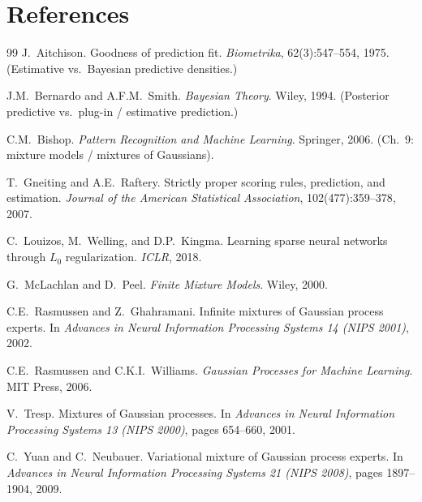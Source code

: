 \documentclass[11pt,a4paper]{article}
\theoremstyle{plain}
\theoremstyle{definition}
\theoremstyle{remark}
\begin{document}
\section*{References}
\begin{thebibliography}{99}
J.~Aitchison.
\newblock Goodness of prediction fit.
\newblock \emph{Biometrika}, 62(3):547--554, 1975.
\newblock (Estimative vs.\ Bayesian predictive densities.)

J.M.~Bernardo and A.F.M.~Smith.
\newblock \emph{Bayesian Theory}.
\newblock Wiley, 1994.
\newblock (Posterior predictive vs.\ plug-in / estimative prediction.)

C.M.~Bishop.
\newblock \emph{Pattern Recognition and Machine Learning}.
\newblock Springer, 2006.
\newblock (Ch.~9: mixture models / mixtures of Gaussians).

T.~Gneiting and A.E.~Raftery.
\newblock Strictly proper scoring rules, prediction, and estimation.
\newblock \emph{Journal of the American Statistical Association}, 102(477):359--378, 2007.

C.~Louizos, M.~Welling, and D.P.~Kingma.
\newblock Learning sparse neural networks through \(L_0\) regularization.
\newblock \emph{ICLR}, 2018.

G.~McLachlan and D.~Peel.
\newblock \emph{Finite Mixture Models}.
\newblock Wiley, 2000.

C.E.~Rasmussen and Z.~Ghahramani.
\newblock Infinite mixtures of Gaussian process experts.
\newblock In \emph{Advances in Neural Information Processing Systems 14 (NIPS 2001)},
  2002.

C.E.~Rasmussen and C.K.I.~Williams.
\newblock \emph{Gaussian Processes for Machine Learning}.
\newblock MIT Press, 2006.

V.~Tresp.
\newblock Mixtures of Gaussian processes.
\newblock In \emph{Advances in Neural Information Processing Systems 13 (NIPS 2000)},
  pages 654--660, 2001.

C.~Yuan and C.~Neubauer.
\newblock Variational mixture of Gaussian process experts.
\newblock In \emph{Advances in Neural Information Processing Systems 21 (NIPS 2008)},
  pages 1897--1904, 2009.
\end{thebibliography}
\end{document}
